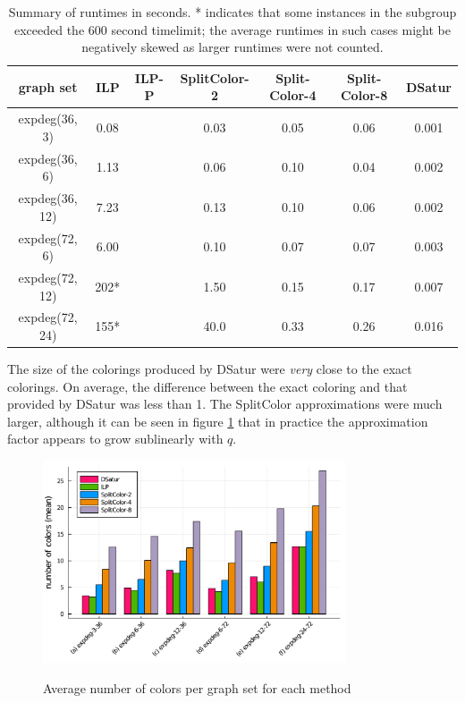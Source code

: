 \documentclass[twocolumn]{article}
\begin{document}
\begin{table}
	\centering
	\caption{Summary of runtimes in seconds. * indicates that some instances in the subgroup exceeded the 600 second timelimit; the average runtimes in such cases might be negatively skewed as larger runtimes were not counted.}
	\begin{tabular}[width=\textwidth]{|c||c|c|c|c|c|c|}
		\hline
		\textbf{graph set} & ILP & ILP-P & SplitColor-2 & Split-Color-4 & Split-Color-8 & DSatur \\
		\hline
		expdeg(36, 3)  & 0.08 & & 0.03 & 0.05 & 0.06 & 0.001 \\
		expdeg(36, 6)  & 1.13 & & 0.06 & 0.10 & 0.04 & 0.002 \\
		expdeg(36, 12) & 7.23 & & 0.13 & 0.10 & 0.06 & 0.002 \\
		expdeg(72, 6)  & 6.00 & & 0.10 & 0.07 & 0.07 & 0.003 \\
		expdeg(72, 12) & 202*  & & 1.50 & 0.15 & 0.17 & 0.007 \\
		expdeg(72, 24) & 155*  & & 40.0 & 0.33 & 0.26 & 0.016 \\
		\hline
	\end{tabular}
	\label{tab:runtimes}
\end{table}

The size of the colorings produced by DSatur were \emph{very} close to the exact colorings. On average, the difference between the exact coloring and that provided by DSatur was less than 1. The SplitColor approximations were much larger, although it can be seen in figure \ref{fig:colorings} that in practice the approximation factor appears to grow sublinearly with $q$.

\begin{figure}
	\centering
	\caption{Average number of colors per graph set for each method}
	\includegraphics[width=0.8\textwidth]{exp1_colors.pdf}
	\label{fig:colorings}
\end{figure}
\end{document}
